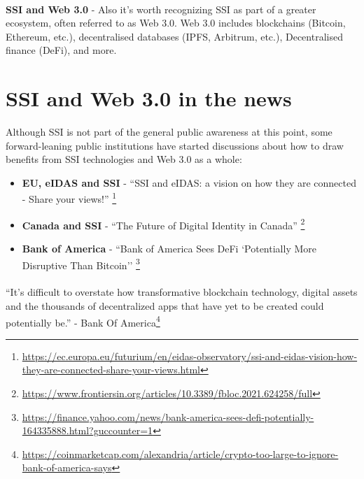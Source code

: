 \paragraph{}

\textbf{SSI and Web 3.0} - Also it's worth recognizing SSI as part of a greater ecosystem, often referred to as Web 3.0. Web 3.0 includes blockchains (Bitcoin, Ethereum, etc.), decentralised databases (IPFS, Arbitrum, etc.), Decentralised finance (DeFi), and more.




\pagebreak




\hypertarget{ssi-and-web-3.0-in-the-news}{%
\section{SSI and Web 3.0 in the
news}\label{ssi-and-web-3.0-in-the-news}}

Although SSI is not part of the general public awareness at this point,
some forward-leaning public institutions have started discussions about
how to draw benefits from SSI technologies and Web 3.0 as a whole:

\begin{itemize}
\tightlist
\item
    \textbf{EU, eIDAS and SSI} - ``SSI and eIDAS: a vision on how they are connected - Share your views!'' \footnote{\url{https://ec.europa.eu/futurium/en/eidas-observatory/ssi-and-eidas-vision-how-they-are-connected-share-your-views.html}}
\item
    \textbf{Canada and SSI} - ``The Future of Digital Identity in Canada'' \footnote{\url{https://www.frontiersin.org/articles/10.3389/fbloc.2021.624258/full}}
\item
    \textbf{Bank of America} - ``Bank of America Sees DeFi `Potentially More Disruptive Than Bitcoin'' \footnote{\url{https://finance.yahoo.com/news/bank-america-sees-defi-potentially-164335888.html?guccounter=1}}
\end{itemize}

\paragraph{}

``It's difficult to overstate how transformative blockchain
technology, digital assets and the thousands of decentralized apps that
have yet to be created could potentially be.'' - Bank Of America\footnote{\url{https://coinmarketcap.com/alexandria/article/crypto-too-large-to-ignore-bank-of-america-says}}





